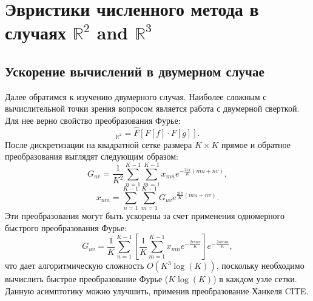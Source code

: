 \chapter{Эвристики численного метода в случаях $ \mathbb{R}^2 $ and $ \mathbb{R}^3 $ }

\section{Ускорение вычислений в двумерном случае}

Далее обратимся к изучению двумерного случая. Наиболее сложным с вычислительной точки зрения вопросом является работа с двумерной сверткой. Для нее верно свойство преобразования Фурье: 
 \begin{equation*}
[f*g]_{\mathbb{R}^{2}}=\hat{F}[F[f]\cdot F[g]]. 
\end{equation*}
После дискретизации на квадратной сетке размера $ K\times K $ прямое и обратное преобразования выглядят следующим образом:
\begin{equation*}
 G_{uv}=\frac{1}{K^{2}}\sum\limits _{n=1}^{K-1}\sum\limits _{m=1}^{K-1}x_{mn}e^{-\frac{2i\pi}{K}(mu+nv)},
\end{equation*}
\begin{equation*}
 x_{nm}=\sum\limits _{n=1}^{K-1}\sum\limits _{m=1}^{K-1}G_{uv}e^{\frac{2i\pi}{K}(mu+nv)}.
\end{equation*}
 Эти преобразования могут быть ускорены за счет применения одномерного быстрого преобразования Фурье: 
\begin{equation*}
G_{uv}=\frac{1}{K}\sum\limits _{n=1}^{K-1}\left[\frac{1}{K}\sum\limits _{m=1}^{K-1}x_{mn}e^{-\frac{2i\pi nv}{K}}\right]e^{-\frac{2i\pi mu}{K}}, 
\end{equation*}
что дает алгоритмическую сложность $ O(K^{3}\log(K)) $, поскольку необходимо вычислить быстрое преобразование Фурье ($ K\log(K) $) в каждом узле сетки. Данную асимптотику можно улучшить, применив преобразование Ханкеля CITE. 

